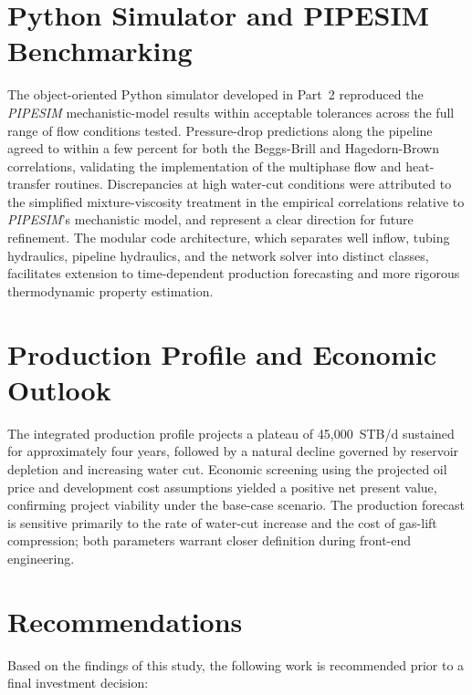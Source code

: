 \section{Python Simulator and PIPESIM Benchmarking}

The object-oriented Python simulator developed in Part~2 
reproduced the \emph{PIPESIM} \cite{Schlumberger2023} mechanistic-model results
within acceptable tolerances across the full range of flow conditions tested.
Pressure-drop predictions along the pipeline agreed to within a few percent
for both the Beggs-Brill \cite{BeggsBrill1973} and Hagedorn-Brown
\cite{HagedornBrown1965} correlations, validating the implementation of the
multiphase flow and heat-transfer routines.
Discrepancies at high water-cut conditions were attributed to the simplified
mixture-viscosity treatment in the empirical correlations relative to
\emph{PIPESIM}'s mechanistic model, and represent a clear direction for future
refinement.
The modular code architecture, which separates well inflow, tubing hydraulics,
pipeline hydraulics, and the network solver into distinct classes, facilitates
extension to time-dependent production forecasting and more rigorous
thermodynamic property estimation.

\section{Production Profile and Economic Outlook}

The integrated production profile projects a plateau of 45,000~STB/d sustained
for approximately four years, followed by a natural decline governed by
reservoir depletion and increasing water cut.
Economic screening using the projected oil price and development cost
assumptions yielded a positive net present value, confirming project viability
under the base-case scenario.
The production forecast is sensitive primarily to the rate of water-cut
increase and the cost of gas-lift compression; both parameters warrant
closer definition during front-end engineering.

\section{Recommendations}

Based on the findings of this study, the following work is recommended prior
to a final investment decision:

